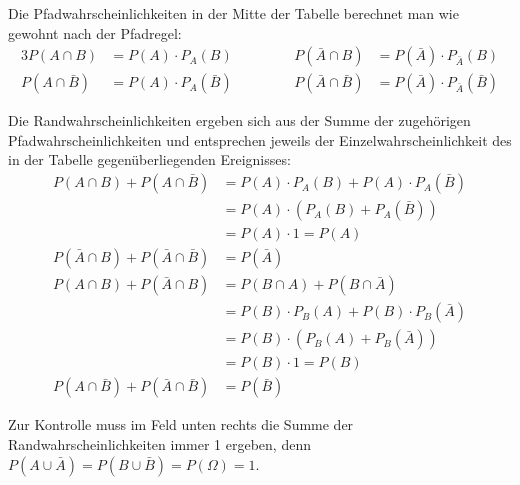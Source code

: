 \documentclass
[
  draft    = true,
  fontsize = 11pt,
  parskip  = half-,
  BCOR     = 0pt,
  DIV      = 11
]
{scrartcl}
\begin{document}
Die Pfadwahrscheinlichkeiten in der Mitte der Tabelle berechnet man wie gewohnt
nach der Pfadregel:
\begin{alignat*}{3}
       P(A\cap B)&=P(A)\cdot P_{A}(B)       & \quad&\quad &      P(\bar{A}\cap B)&=P(\bar{A})\cdot P_{\bar{A}}(B) \\
  P(A\cap\bar{B})&=P(A)\cdot P_{A}(\bar{B}) & \quad&\quad & P(\bar{A}\cap\bar{B})&=P(\bar{A})\cdot P_{\bar{A}}(\bar{B})
\end{alignat*}

Die Randwahrscheinlichkeiten ergeben sich aus der Summe der zugehörigen
Pfadwahrscheinlichkeiten und entsprechen jeweils der Einzelwahrscheinlichkeit
des in der Tabelle gegenüberliegenden Ereignisses:
\begin{equation*}
  \begin{split}
                P(A\cap B)+P(A\cap\bar{B})&=P(A)\cdot P_{A}(B)+P(A)\cdot P_{A}(\bar{B})   \\
                                          &=P(A)\cdot\left(P_{A}(B)+P_{A}(\bar{B})\right) \\
                                          &=P(A)\cdot1=P(A)                               \\[2ex]
    P(\bar{A}\cap B)+P(\bar{A}\cap\bar{B})&=P(\bar{A})                                    \\[4ex]
               P(A\cap B)+P(\bar{A}\cap B)&=P(B\cap A)+P(B\cap\bar{A})                    \\
                                          &=P(B)\cdot P_{B}(A)+P(B)\cdot P_{B}(\bar{A})   \\
                                          &=P(B)\cdot\left(P_{B}(A)+P_{B}(\bar{A})\right) \\
                                          &=P(B)\cdot1=P(B)                               \\[2ex]
     P(A\cap\bar{B})+P(\bar{A}\cap\bar{B})&=P(\bar{B})
  \end{split}
\end{equation*}

Zur Kontrolle muss im Feld unten rechts die Summe der Randwahrscheinlichkeiten
immer 1 ergeben, denn $P(A\cup\bar{A})=P(B\cup\bar{B})=P(\Omega)=1$.
\end{document}
